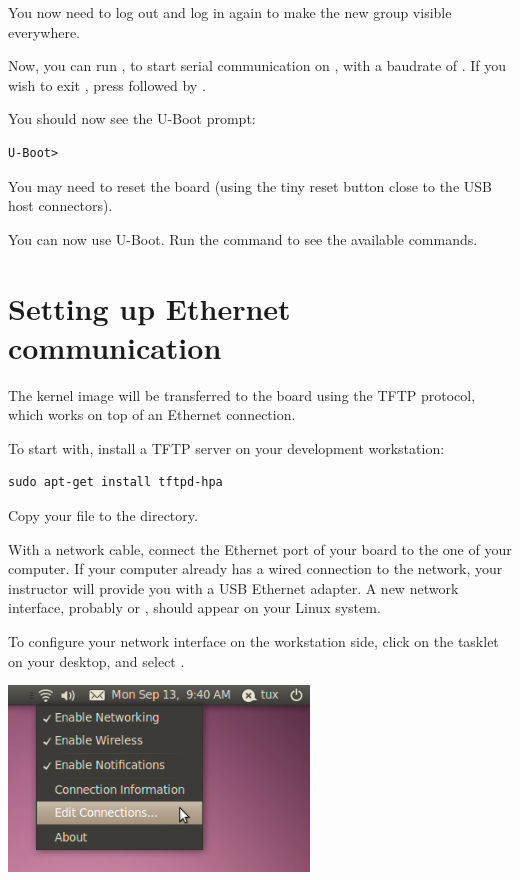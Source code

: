 You now need to log out and log in again to make the new group
visible everywhere.

Now, you can run , to start serial
communication on , with a baudrate of . If
you wish to exit , press \code{[Ctrl][a]} followed by
\code{[Ctrl][x]}.

You should now see the U-Boot prompt:
\begin{verbatim}
U-Boot>
\end{verbatim}

You may need to reset the board (using the tiny reset button close to
the USB host connectors).

You can now use U-Boot. Run the  command to see the available
commands.

\section{Setting up Ethernet communication}

The kernel image will be transferred to the board using the TFTP
protocol, which works on top of an Ethernet connection.

To start with, install a TFTP server on your development workstation:

\begin{verbatim}
sudo apt-get install tftpd-hpa
\end{verbatim}

Copy your  file to the  directory.

With a network cable, connect the Ethernet port of your board to the
one of your computer. If your computer already has a wired connection
to the network, your instructor will provide you with a USB Ethernet
adapter. A new network interface, probably  or ,
should appear on your Linux system.

To configure your network interface on the workstation side, click on
the  tasklet on your desktop, and select
.

\begin{center}
\includegraphics[width=8cm]{labs/kernel-module-environment/network-config-1.png}
\end{center}

